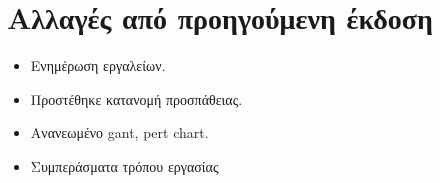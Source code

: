 \section*{Αλλαγές από προηγούμενη έκδοση}
\begin{itemize}
    \item Ενημέρωση εργαλείων.
    \item Προστέθηκε κατανομή προσπάθειας.
    \item Ανανεωμένο gant, pert chart.
    \item Συμπεράσματα τρόπου εργασίας
\end{itemize}
\clearpage